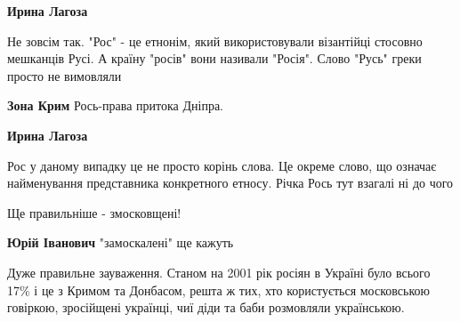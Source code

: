 \begin{itemize}
\begin{itemize}
\textbf{Ирина Лагоза} 

Не зовсім так. "Рос" - це етнонім, який використовували візантійці стосовно
мешканців Русі. А країну "росів" вони називали "Росія". Слово "Русь" греки
просто не вимовляли

 
\textbf{Зона Крим} Рось-права притока Дніпра.

 
\textbf{Ирина Лагоза} 

Рос у даному випадку це не просто корінь слова. Це окреме слово, що означає
найменування представника конкретного етносу. Річка Рось тут взагалі ні до чого

\end{itemize}

 
Ще правильніше - змосковщені!

\begin{itemize}
 
\textbf{Юрій Іванович} "замоскалені" ще кажуть
\end{itemize}

 

Дуже правильне зауваження. Станом на 2001 рік росіян в Україні було всього 17\%
і це з Кримом та Донбасом, решта ж тих, хто користується московською говіркою,
зросійщені українці, чиї діди та баби розмовляли українською.



\end{itemize}

